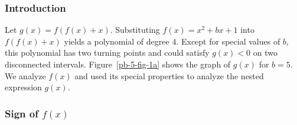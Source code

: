 
\subsubsection*{Introduction}

Let $g(x)=f(f(x)+x)$. 
Substituting $f(x)=x^{2}+bx+1$ into $f(f(x)+x)$ yields a polynomial of degree $4$. Except for special values of $b$, this polynomial has two turning points and could satisfy $g(x)<0$ on two disconnected intervals. Figure~\ref{pb-5-fig-1a} shows the graph of $g(x)$ for $b=5$. We analyze $f(x)$ and used its special properties to analyze the nested expression $g(x)$. 

\subsubsection*{Sign of $f(x)$}

